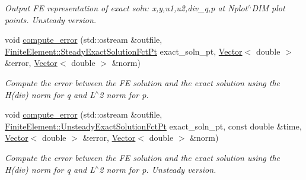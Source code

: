 \begin{DoxyCompactItemize}
\begin{DoxyCompactList}\small\item\em Output FE representation of exact soln\+: x,y,u1,u2,div\+\_\+q,p at Nplot$^\wedge$\+D\+IM plot points. Unsteady version. \end{DoxyCompactList}\item 
void \hyperlink{classoomph_1_1PoroelasticityEquations_a9ad9413383820342f2c5a967c4bf4e94}{compute\+\_\+error} (std\+::ostream \&outfile, \hyperlink{classoomph_1_1FiniteElement_a690fd33af26cc3e84f39bba6d5a85202}{Finite\+Element\+::\+Steady\+Exact\+Solution\+Fct\+Pt} exact\+\_\+soln\+\_\+pt, \hyperlink{classoomph_1_1Vector}{Vector}$<$ double $>$ \&error, \hyperlink{classoomph_1_1Vector}{Vector}$<$ double $>$ \&norm)
\begin{DoxyCompactList}\small\item\em Compute the error between the FE solution and the exact solution using the H(div) norm for q and L$^\wedge$2 norm for p. \end{DoxyCompactList}\item 
void \hyperlink{classoomph_1_1PoroelasticityEquations_acc847138fbcb1833934129ef676e03a9}{compute\+\_\+error} (std\+::ostream \&outfile, \hyperlink{classoomph_1_1FiniteElement_ad4ecf2b61b158a4b4d351a60d23c633e}{Finite\+Element\+::\+Unsteady\+Exact\+Solution\+Fct\+Pt} exact\+\_\+soln\+\_\+pt, const double \&time, \hyperlink{classoomph_1_1Vector}{Vector}$<$ double $>$ \&error, \hyperlink{classoomph_1_1Vector}{Vector}$<$ double $>$ \&norm)
\begin{DoxyCompactList}\small\item\em Compute the error between the FE solution and the exact solution using the H(div) norm for q and L$^\wedge$2 norm for p. Unsteady version. \end{DoxyCompactList}\end{DoxyCompactItemize}
